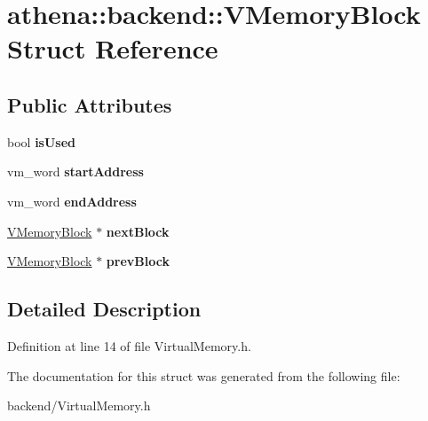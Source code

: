 \hypertarget{structathena_1_1backend_1_1_v_memory_block}{}\section{athena\+:\+:backend\+:\+:V\+Memory\+Block Struct Reference}
\label{structathena_1_1backend_1_1_v_memory_block}
\subsection*{Public Attributes}
\begin{DoxyCompactItemize}
\item 
\mbox{\label{structathena_1_1backend_1_1_v_memory_block_a54350a136efca373277b4d91a09c15cf}} 
bool {\bfseries is\+Used}
\item 
\mbox{\label{structathena_1_1backend_1_1_v_memory_block_ae7999c6fd515f8150185b23a52e410a8}} 
vm\+\_\+word {\bfseries start\+Address}
\item 
\mbox{\label{structathena_1_1backend_1_1_v_memory_block_a2585be4f90d28d5d0838934f3569ea00}} 
vm\+\_\+word {\bfseries end\+Address}
\item 
\mbox{\label{structathena_1_1backend_1_1_v_memory_block_a2bf211c6220136d1f9d38c86043ae2c6}} 
\mbox{\hyperlink{structathena_1_1backend_1_1_v_memory_block}{V\+Memory\+Block}} $\ast$ {\bfseries next\+Block}
\item 
\mbox{\label{structathena_1_1backend_1_1_v_memory_block_a9827bc62cfcb085a80d236311b7e1e2c}} 
\mbox{\hyperlink{structathena_1_1backend_1_1_v_memory_block}{V\+Memory\+Block}} $\ast$ {\bfseries prev\+Block}
\end{DoxyCompactItemize}


\subsection{Detailed Description}


Definition at line 14 of file Virtual\+Memory.\+h.



The documentation for this struct was generated from the following file\+:\begin{DoxyCompactItemize}
\item 
backend/Virtual\+Memory.\+h\end{DoxyCompactItemize}
